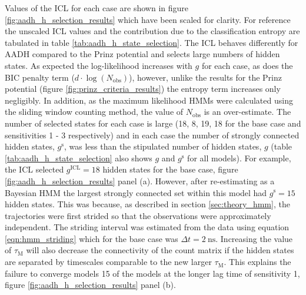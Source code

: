 Values of the ICL for each case are shown in figure \ref{fig:aadh_h_selection_results} which have been scaled for clarity. For reference the unscaled ICL values and the contribution due to the classification entropy are tabulated in table \ref{tab:aadh_h_state_selection}. The ICL behaves differently for AADH compared to the Prinz potential and selects large numbers of hidden states. As expected the log-likelihood increases with $g$ for each case, as does the BIC penalty term ($d\cdot\log{\left(N_{\mathrm{obs}}\right)}$), however, unlike the results for the Prinz potential (figure \ref{fig:prinz_criteria_results}) the entropy term increases only negligibly. In addition, as the maximum likelihood HMMs were calculated using the sliding window counting method, the value of $N_{\mathrm{obs}}$ is an over-estimate. The number of selected states for each case is large (18, 8, 19, 18 for the base case and sensitivities 1 - 3 respectively) and in each case the number of strongly connected hidden states, $g^{\mathrm{s}}$, was less than the stipulated number of hidden states, $g$ (table \ref{tab:aadh_h_state_selection} also shows $g$ and $g^{\mathrm{s}}$ for all models). For example, the ICL selected $g^{\mathrm{ICL}}=18$ hidden states for the base case, figure \ref{fig:aadh_h_selection_results} panel (a). However, after re-estimating as a Bayesian HMM the largest strongly connected set within this model had  $g^{\mathrm{s}}=15$ hidden states. This was because, as described in section \ref{sec:theory_hmm}, the trajectories were first strided so that the observations were approximately independent. The striding interval was estimated from the data using  equation \ref{eqn:hmm_striding} which for the base case was $\Delta t = \SI{2}{\nano\second}$. Increasing the value of $\tau_{\mathrm{M}}$ will also decrease the connectivity of the count matrix if the hidden states are separated by timescales comparable to the new larger $\tau_{\mathrm{M}}$. This explains the failure to converge models 15 of the models at the longer lag time of sensitivity 1, figure \ref{fig:aadh_h_selection_results} panel (b).   


